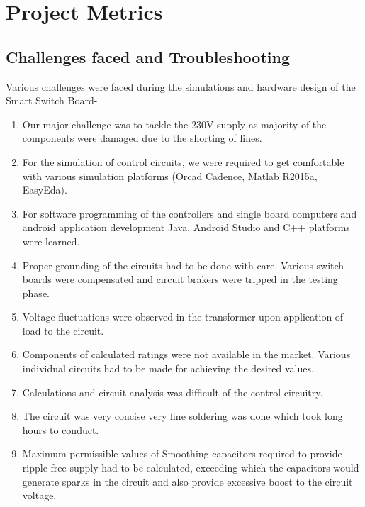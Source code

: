 \chapter{Project Metrics}
        \section{Challenges faced and Troubleshooting}
        
        Various challenges were faced during the simulations and hardware design of the Smart Switch Board-
        \begin{enumerate}
			\item Our major challenge was to tackle the 230V supply as majority of the components were damaged due to the shorting of lines.
			
			\item For the simulation of control circuits, we were required to get comfortable with various simulation platforms (Orcad Cadence, Matlab R2015a, EasyEda).
			
			\item For software programming of the controllers and single board computers and android application development Java, Android Studio and C++ platforms were learned.
			
			\item Proper grounding of the circuits had to be done with care. Various switch boards were compensated and circuit brakers were tripped in the testing phase.
			
			\item Voltage fluctuations were observed in the transformer upon application of load to the circuit.
			
			\item  Components of calculated ratings were not available in the market. Various individual circuits had to be made for achieving the desired values.
			
			\item  Calculations and circuit analysis was difficult of the control circuitry.
			
			\item The circuit was very concise very fine soldering was done which took long hours to conduct.
			
			\item Maximum permissible values of Smoothing capacitors required to provide ripple free supply had to be calculated, exceeding which the capacitors would generate sparks in the circuit and also provide excessive boost to the circuit voltage.
			

\end{enumerate}
